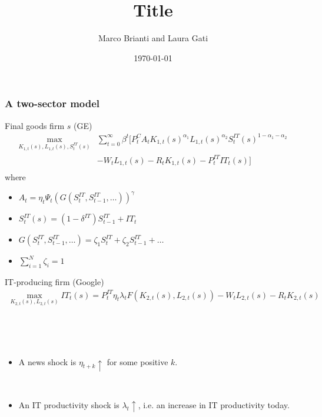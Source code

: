 \documentclass{beamer}
\author[Brianti, Gati]{Marco Brianti and Laura Gati}
\institute[Boston College]{Boston College}
\title{Title}
\date{\today}
\begin{document}
\begin{frame}

\maketitle


\end{frame}


\begin{frame}
\frametitle{A two-sector model}

Final goods firm $s$ (GE)
\begin{align*}
\max_{K_{1,t}(s), L_{1,t}(s), S^{IT}_t(s) }  & \sum_{t=0}^{\infty} \beta^t \Big[ P_t^C A_t K_{1,t}(s)^{\alpha_1}L_{1,t}(s)^{\alpha_2}S^{IT}_t(s)^{1-\alpha_1 - \alpha_2} \\
& - W_t L_{1,t}(s) -R_tK_{1,t}(s) -P^{IT}_t IT_t(s) \Big] \\
\end{align*}
where
\begin{itemize} 
	\item $A_t =  \eta_t \Psi_t (G(S^{IT}_t,S^{IT}_{t-1},\dots))^{\gamma}$   
	\item $S^{IT}_t(s) =  (1-\delta^{IT})S^{IT}_{t-1} + IT_t$
	\item $G(S^{IT}_t,S^{IT}_{t-1},\dots) = \zeta_1 S_t^{IT} + \zeta_2 S^{IT}_{t-1} + \dots$
	\item $\sum_{i=1}^{N} \zeta_i = 1$
  \end{itemize}


\end{frame}

\begin{frame}

IT-producing firm (Google)
\begin{align*}
\max_{K_{2,t}(s), L_{2,t}(s)} IT_t(s) = P^{IT}_t \eta_t \lambda_t F(K_{2,t}(s), L_{2,t}(s)) -W_t L_{2,t}(s) - R_t K_{2,t}(s)
\end{align*}

\

\

\begin{itemize}
\item A news shock is $\eta_{t+k} \uparrow$ for some positive $k$. 

\

\item An IT productivity shock is $\lambda_{t} \uparrow$, i.e. an increase in IT productivity today. 
\end{itemize}


\end{frame}
\end{document}

